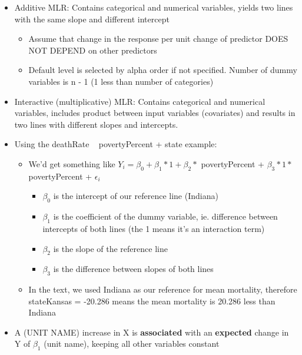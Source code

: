 \documentclass[8pt,landscape,a4paper, fleqn, dvipsnames]{extarticle}
\begin{document}
\begin{multicols*}{4}
\begin{itemize}
\begin{itemize}
    \end{itemize}
    \item Additive MLR: Contains categorical and numerical variables, yields two lines with the same slope and different intercept
    \begin{itemize}
        \item Assume that change in the response per unit change of predictor DOES NOT DEPEND on other predictors
        \item Default level is selected by alpha order if not specified. Number of dummy variables is n - 1 (1 less than number of categories)
    \end{itemize}
    \item Interactive (multiplicative) MLR: Contains categorical and numerical variables, includes product between input variables (covariates) and results in two lines with different slopes and intercepts.
    \item Using the deathRate ~ povertyPercent + state example:
    \begin{itemize}
        \item We'd get something like $Y_i = \beta_0 + \beta_1 * 1 + \beta_2 *$ povertyPercent + $\beta_3 * 1 * $ povertyPercent + $\epsilon_i$
        \begin{itemize}
            \item $\beta_0$ is the intercept of our reference line (Indiana)
            \item $\beta_1$ is the coefficient of the dummy variable, ie. difference between intercepts of both lines (the 1 means it's an interaction term)
            \item $\beta_2$ is the slope of the reference line
            \item $\beta_3$ is the difference between slopes of both lines 
        \end{itemize}
        \item In the text, we used Indiana as our reference for mean mortality, therefore stateKansas = -20.286 means the mean mortality is 20.286 less than Indiana
    \end{itemize}
    \item A (UNIT NAME) increase in X is \textbf{associated} with an \textbf{expected} change in Y of $\beta_1$ (unit name), keeping all other variables constant
    \begin{lstlisting}
        
    \end{lstlisting}
\end{itemize}


\end{multicols*}
\end{document}
